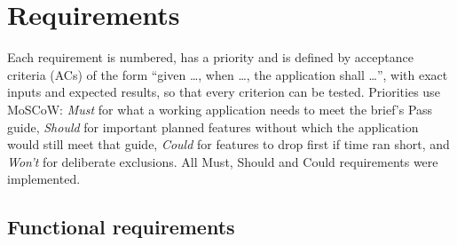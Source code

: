 \documentclass[11pt,a4paper]{article}
\begin{document}
\section{Requirements}

Each requirement is numbered, has a priority and is defined by acceptance
criteria (ACs) of the form \enquote{given \ldots, when \ldots, the application
shall \ldots}, with exact inputs and expected results, so that every
criterion can be tested. Priorities use MoSCoW: \emph{Must} for what a working
application needs to meet the brief's Pass guide, \emph{Should} for important
planned features without which the application would still meet that guide,
\emph{Could} for features to drop first if time ran short, and \emph{Won't}
for deliberate exclusions. All Must, Should and Could requirements were
implemented.

\subsection{Functional requirements}
\end{document}
